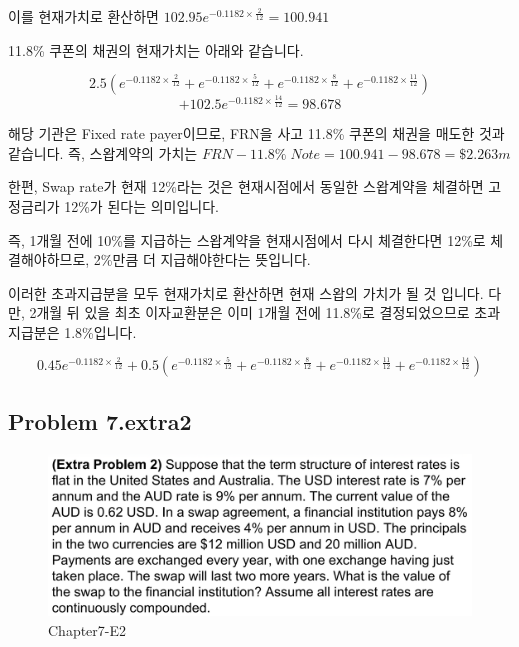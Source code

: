\documentclass[
  letterpaper,
  DIV=11,
  numbers=noendperiod]{scrreprt}
\begin{document}
이를 현재가치로 환산하면 \(102.95e^{-0.1182\times\frac{2}{12}}=100.941\)

11.8\% 쿠폰의 채권의 현재가치는 아래와 같습니다.

\[2.5(e^{-0.1182\times\frac{2}{12}}+e^{-0.1182\times\frac{5}{12}}+e^{-0.1182\times\frac{8}{12}}+e^{-0.1182\times\frac{11}{12}})\]
\[+102.5e^{-0.1182\times\frac{14}{12}}=98.678\]

해당 기관은 Fixed rate payer이므로, FRN을 사고 11.8\% 쿠폰의 채권을
매도한 것과 같습니다. 즉, 스왑계약의 가치는
\(FRN-11.8\%\;Note=100.941-98.678=\$2.263m\)

\begin{tcolorbox}[enhanced jigsaw, toprule=.15mm, breakable, left=2mm, leftrule=.75mm, opacitybacktitle=0.6, coltitle=black, rightrule=.15mm, colback=white, titlerule=0mm, bottomtitle=1mm, colframe=quarto-callout-note-color-frame, title=\textcolor{quarto-callout-note-color}{\faInfo}\hspace{0.5em}{직관적인 풀이방법}, toptitle=1mm, arc=.35mm, colbacktitle=quarto-callout-note-color!10!white, opacityback=0, bottomrule=.15mm]

한편, Swap rate가 현재 12\%라는 것은 현재시점에서 동일한 스왑계약을
체결하면 고정금리가 12\%가 된다는 의미입니다.

즉, 1개월 전에 10\%를 지급하는 스왑계약을 현재시점에서 다시 체결한다면
12\%로 체결해야하므로, 2\%만큼 더 지급해야한다는 뜻입니다.

이러한 초과지급분을 모두 현재가치로 환산하면 현재 스왑의 가치가 될 것
입니다. 다만, 2개월 뒤 있을 최초 이자교환분은 이미 1개월 전에 11.8\%로
결정되었으므로 초과지급분은 1.8\%입니다.

\[0.45e^{-0.1182\times\frac{2}{12}}+0.5(e^{-0.1182\times\frac{5}{12}}+e^{-0.1182\times\frac{8}{12}}+e^{-0.1182\times\frac{11}{12}}+e^{-0.1182\times\frac{14}{12}})\]

\end{tcolorbox}

\subsection*{\texorpdfstring{\textbf{Problem
7.extra2}}{Problem 7.extra2}}\label{problem-7.extra2}

\begin{figure}[H]

{\centering \includegraphics{images/선물옵션_7-extra2.png}

}

\caption{Chapter7-E2}

\end{figure}%
\end{document}
